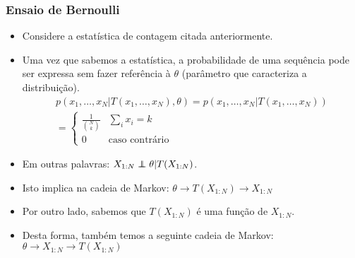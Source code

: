 \begin{frame}[allowframebreaks]
  \frametitle{Ensaio de Bernoulli}
  \begin{itemize}
  \item Considere a estatística de contagem citada anteriormente. 
  \item Uma vez que sabemos a estatística, a probabilidade de uma sequência pode ser expressa
        sem fazer referência à $\theta$ (parâmetro que caracteriza a distribuição).
        \begin{multline}
        p(x_1,\ldots,x_N|T(x_1,\ldots,x_N),\theta) = p(x_1,\ldots,x_N|T(x_1,\ldots,x_N)) \\
        = \begin{cases} 
                \frac{1}{{N \choose k}} &  \sum_i x_i = k \\
                0       & \text{caso contrário}
        \end{cases}
        \end{multline}
  \item Em outras palavras: $X_{1:N} \independent \theta | T(X_{1:N})$.
  \item Isto implica na cadeia de Markov: $\theta \rightarrow T(X_{1:N}) \rightarrow X_{1:N}$
  \item Por outro lado, sabemos que $T(X_{1:N})$ é uma função de $X_{1:N}$.
  \item Desta forma, também temos a seguinte cadeia de Markov: $\theta \rightarrow X_{1:N} \rightarrow T(X_{1:N})$
  \end{itemize}
\end{frame}

